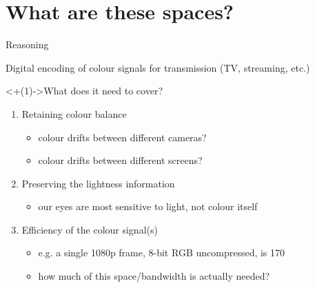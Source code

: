 \documentclass[aspectratio=169,handout,usepdftitle=false]{fireshonks}
\begin{document}
\section{What are these spaces?}
\begin{frame}{Reasoning}
    \begin{center}
        Digital encoding of colour signals for transmission (TV, streaming, etc.)
    \end{center}

    \uncover<+(1)->{What does it need to cover? \autocite{tooms}}
    \begin{enumerate}[<+(1)->]
        \item Retaining colour balance
              \begin{itemize}
                  \item colour drifts between different cameras? 
                  \item colour drifts between different screens? 
              \end{itemize}
        \item Preserving the lightness information
              \begin{itemize}
                  \item our eyes are most sensitive to light, not colour itself
              \end{itemize}
        \item Efficiency of the colour signal(s)
              \begin{itemize}
                  \item e.g. a single 1080p frame, 8-bit RGB uncompressed, is \SI{170}{\mega\byte}
                  \item how much of this space/bandwidth is actually needed?
              \end{itemize}
    \end{enumerate}
\end{frame}
\end{document}
